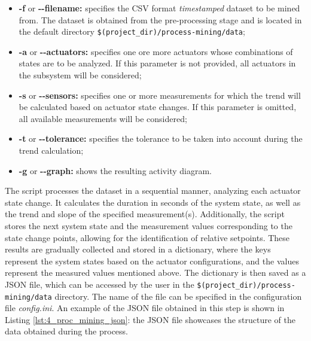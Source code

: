 \begin{itemize}
	\item \textbf{-f} or \textbf{{-}{-}filename:} specifies the CSV format \textit{timestamped} dataset to be mined from. The dataset is obtained from the pre-processing stage and is located in the default directory \texttt{\$(project\_dir)/process-mining/data};
	
	\item \textbf{-a} or \textbf{{-}{-}actuators:} specifies one ore more actuators whose combinations of states are to be analyzed. If this parameter is not provided, all actuators in the subsystem will be considered;
	
	\item \textbf{-s} or \textbf{{-}{-}sensors:} specifies one or more measurements for which the trend will be calculated based on actuator state changes. If this parameter is omitted, all available measurements will be considered;
	
	\item \textbf{-t} or \textbf{{-}{-}tolerance:} specifies the tolerance to be taken into account during the trend calculation; 
	
	\item \textbf{-g} or \textbf{{-}{-}graph:} shows the resulting activity diagram.
\end{itemize}

The script processes the dataset in a sequential manner, analyzing each actuator state change. It calculates the duration in seconds of the system state, as well as the trend and slope of the specified measurement(s). Additionally, the script stores the next system state and the measurement values corresponding to the state change points, allowing for the identification of relative setpoints. These results are gradually collected and stored in a dictionary, where the keys represent the system states based on the actuator configurations, and the values represent the measured values mentioned above. The dictionary is then saved as a JSON file, which can be accessed by the user in the \texttt{\$(project\_dir)/process-mining/data} directory. The name of the file can be specified in the configuration file \textit{config.ini}.\newline \newline
An example of the JSON file obtained in this step is shown in Listing \ref{lst:4_proc_mining_json}: the JSON file showcases the structure of the data obtained during the process.

